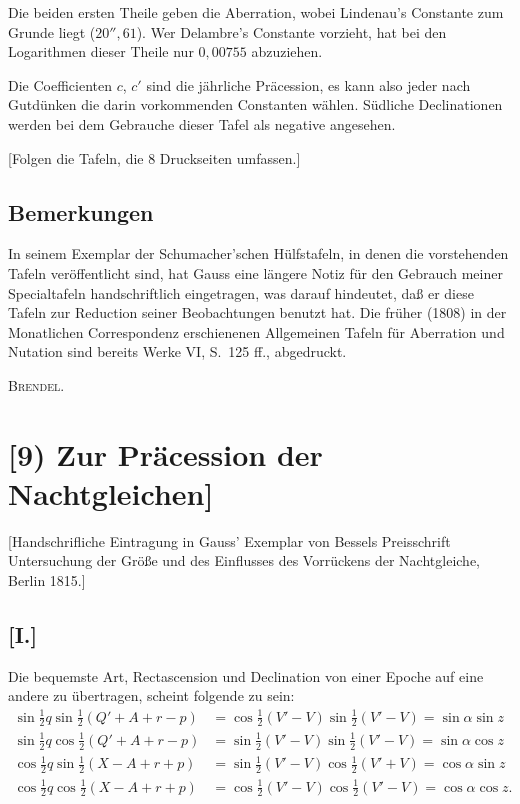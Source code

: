 \documentclass[12pt,a4paper]{article}
\theoremstyle{plain}
\theoremstyle{definition}
\theoremstyle{remark}
\begin{document}
Die beiden ersten Theile geben die Aberration, wobei Lindenau's Constante zum Grunde liegt ($20''{,}61$). Wer Delambre's Constante vorzieht, hat bei den Logarithmen dieser Theile nur $0{,}00755$ abzuziehen.

Die Coefficienten $c$, $c'$ sind die j\"ahrliche Pr\"acession, es kann also jeder nach Gutd\"unken die darin vorkommenden Constanten w\"ahlen. S\"udliche Declinationen werden bei dem Gebrauche dieser Tafel als negative angesehen.

[Folgen die Tafeln, die 8 Druckseiten umfassen.]

\subsection*{Bemerkungen}

In seinem Exemplar der Schumacher'schen H\"ulfstafeln, in denen die vorstehenden Tafeln ver\"offentlicht sind, hat Gauss eine l\"angere \glqq Notiz f\"ur den Gebrauch meiner Specialtafeln\grqq{} handschriftlich eingetragen, was darauf hindeutet, da\ss{} er diese Tafeln zur Reduction seiner Beobachtungen benutzt hat. Die fr\"uher (1808) in der Monatlichen Correspondenz erschienenen \glqq Allgemeinen Tafeln f\"ur Aberration und Nutation\grqq{} sind bereits Werke VI, S.~125 ff., abgedruckt.

\hfill\textsc{Brendel}.

\newpage

\section*{[9) Zur Pr\"acession der Nachtgleichen]}

[Handschrifliche Eintragung in Gauss' Exemplar von Bessels Preisschrift \glqq Untersuchung der Gr\"o\ss e und des Einflusses des Vorr\"uckens der Nachtgleiche\grqq, Berlin 1815.]

\subsection*{[I.]}

Die bequemste Art, Rectascension und Declination von einer Epoche auf eine andere zu \"ubertragen, scheint folgende zu sein:
\begin{align*}
\sin\tfrac{1}{2}q \sin\tfrac{1}{2}(Q' + A + r - p) &= \cos\tfrac{1}{2}(V' - V) \sin\tfrac{1}{2}(V' - V) = \sin\alpha \sin z \\
\sin\tfrac{1}{2}q \cos\tfrac{1}{2}(Q' + A + r - p) &= \sin\tfrac{1}{2}(V' - V) \sin\tfrac{1}{2}(V' - V) = \sin\alpha \cos z \\
\cos\tfrac{1}{2}q \sin\tfrac{1}{2}(X - A + r + p) &= \sin\tfrac{1}{2}(V' - V) \cos\tfrac{1}{2}(V' + V) = \cos\alpha \sin z \\
\cos\tfrac{1}{2}q \cos\tfrac{1}{2}(X - A + r + p) &= \cos\tfrac{1}{2}(V' - V) \cos\tfrac{1}{2}(V' - V) = \cos\alpha \cos z.
\end{align*}
\end{document}

